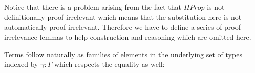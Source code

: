 \begin{code}
\>[4] \<[11]%
\>[11]\AgdaSymbol{:}  \AgdaSymbol{:}   \AgdaSymbol{)(} \AgdaSymbol{:}    \AgdaSymbol{)}  \<[42]%
\>[42]\<%
\\
\>[0]\<[13]%
\>[13]\AgdaFunction{[}   \AgdaFunction{]}  \AgdaFunction{[}  \AgdaFunction{]refl}   \<%
\\
%
\\
\>[0]\<[4]%
\>[4] \AgdaSymbol{:}    \AgdaSymbol{:}   \AgdaSymbol{\}}\<%
\\
\>[0]\<[13]%
\>[13]\AgdaSymbol{\{} \AgdaSymbol{:} \AgdaFunction{[}  \AgdaFunction{]}   \AgdaSymbol{\}\{} \AgdaSymbol{:} \AgdaFunction{[}  \AgdaFunction{]}   \AgdaSymbol{\}}\<%
\\
\>[0]\<[13]%
\>[13]\AgdaSymbol{(} \AgdaSymbol{:}    \AgdaSymbol{)}  \<[30]%
\>[30]\<%
\\
\>[0]\<[13]%
\>[13]\AgdaFunction{[}   \AgdaFunction{]}   \AgdaSymbol{(}  \AgdaSymbol{)}   \AgdaSymbol{(}\AgdaFunction{[}  \AgdaFunction{]trans}  \AgdaSymbol{)} \<%
\\
\end{code}

Notice that there is a problem arising from the fact that $HProp$ is not definitionally proof-irrelevant which means that the substitution here is not automatically proof-irrelevant. Therefore we have to define a series of proof-irrelevance lemmas to help construction and reasoning which are omitted here.

Terms follow naturally as families of elements in the underlying set of types indexed by $\gamma : \Gamma$ which respects the equality as well:


